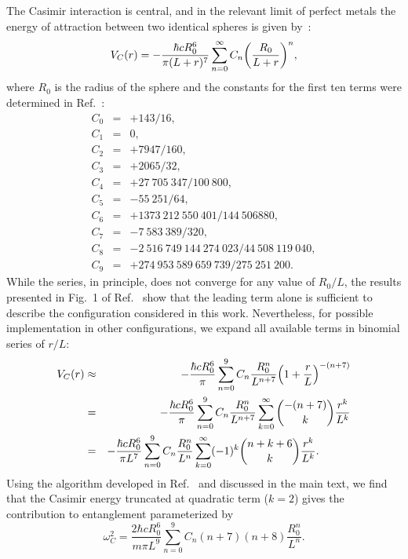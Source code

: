 \documentclass[aps,prd,reprint,superscriptaddress,nofootinbib,floatfix]{revtex4-2}
\begin{document}
The Casimir interaction is central, and in the relevant limit of perfect metals the energy of attraction between two identical spheres is given by~\cite{Casimir-Emig2007,PhysRev.73.360}:
\begin{equation}
V_C(r) = - \frac{\hbar c R_0^6}{\pi(L+r)^7} \sum_{n=0}^{\infty} C_n \qty(\frac{R_0}{L+r})^n ,
\end{equation}
where $R_0$ is the radius of the sphere and the constants for the first ten terms were determined in Ref.~\cite{Casimir-Emig2007}:
\begin{eqnarray}
C_0 &=& + 143/16,
\nonumber	\\
C_1 &=& 0,
\nonumber	\\
C_2 &=&  +  7947/160,
\nonumber	\\
C_3 &=&  + 2065/32,
\nonumber	\\
C_4 &=&  + 27 \ 705 \  347 / 100  \  800,
\nonumber	\\
C_5 &=& - 55  \  251 / 64,
\nonumber	\\
C_6 &=&  + 1 373  \ 212  \ 550 \  401 / 144 \  506 880,
\nonumber	\\
C_7 &=& - 7  \ 583  \ 389 / 320,
\nonumber	\\
C_8 &=& - 2  \ 516 \  749  \ 144  \ 274  \ 023 / 44 \  508 \  119 \  040,
\nonumber	\\
C_9 &=&  + 274  \ 953  \ 589  \ 659 \  739 / 275  \ 251  \ 200.
\end{eqnarray}
While the series, in principle, does not converge for any value of $R_0/L$, the results presented in Fig.~1 of Ref.~\cite{Casimir-Emig2007} show that the leading term alone is sufficient to describe the configuration considered in this work. Nevertheless, for possible implementation in other configurations, we expand all available terms in binomial series of $r/L$:
\begin{eqnarray}
V_C(r) &\approx& - \frac{\hbar c R_0^6}{\pi} \sum_{n=0}^{9} C_n \frac{R_0^n}{L^{n+7}} \qty( 1 + \frac{r}{L} )^{-(n+7)}    \nonumber   \\   &=& - \frac{\hbar c R_0^6}{\pi} \sum_{n=0}^{9} C_n \frac{R_0^n}{L^{n+7}} \sum_{k=0}^{\infty} \binom{-(n+7)}{k} \frac{r^k}{L^k}   \nonumber   \\ 
&=& - \frac{\hbar c R_0^6}{\pi L^7} \sum_{n=0}^{9} C_n \frac{R_0^n}{L^n} \sum_{k=0}^{\infty} (-1)^k \binom{n+k+6}{k} \frac{r^k}{L^k}. \hspace*{1cm}
\end{eqnarray}
Using the algorithm developed in Ref.~\cite{QuantGrav-Ankit2022} and discussed in the main text, we find that the Casimir energy truncated at quadratic term ($k=2$) gives the contribution to entanglement parameterized by
\begin{equation}
\omega_{C}^2 = \frac{2\hbar c R_0^6}{m\pi L^9} \sum_{n=0}^{9} C_n (n+7)(n+8) \frac{R_0^n}{L^n}.
\end{equation}
\end{document}
